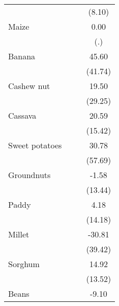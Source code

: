 {\begin{tabular}{l*{3}{c}}
                    &                     &                     &      (8.10)         \\
[1em]
Maize               &                     &                     &        0.00         \\
                    &                     &                     &         (.)         \\
[1em]
Banana              &                     &                     &       45.60         \\
                    &                     &                     &     (41.74)         \\
[1em]
Cashew nut          &                     &                     &       19.50         \\
                    &                     &                     &     (29.25)         \\
[1em]
Cassava             &                     &                     &       20.59         \\
                    &                     &                     &     (15.42)         \\
[1em]
Sweet potatoes      &                     &                     &       30.78         \\
                    &                     &                     &     (57.69)         \\
[1em]
Groundnuts          &                     &                     &       -1.58         \\
                    &                     &                     &     (13.44)         \\
[1em]
Paddy               &                     &                     &        4.18         \\
                    &                     &                     &     (14.18)         \\
[1em]
Millet              &                     &                     &      -30.81         \\
                    &                     &                     &     (39.42)         \\
[1em]
Sorghum             &                     &                     &       14.92         \\
                    &                     &                     &     (13.52)         \\
[1em]
Beans               &                     &                     &       -9.10         \\

\end{tabular}}

